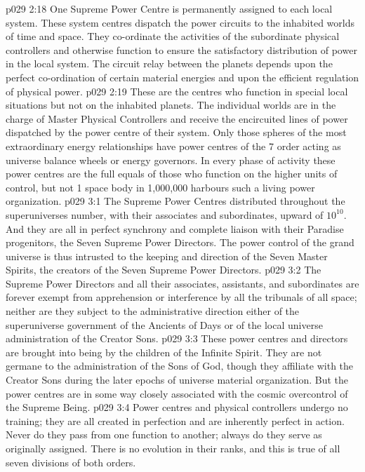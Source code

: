 \vs p029 2:18 \bibnobreakspace {} One Supreme Power Centre is permanently assigned to each local system. These system centres dispatch the power circuits to the inhabited worlds of time and space. They co\hyp{}ordinate the activities of the subordinate physical controllers and otherwise function to ensure the satisfactory distribution of power in the local system. The circuit relay between the planets depends upon the perfect co\hyp{}ordination of certain material energies and upon the efficient regulation of physical power.
\vs p029 2:19 \bibnobreakspace {} These are the centres who function in special local situations but not on the inhabited planets. The individual worlds are in the charge of Master Physical Controllers and receive the encircuited lines of power dispatched by the power centre of their system. Only those spheres of the most extraordinary energy relationships have power centres of the 7 order acting as universe balance wheels or energy governors. In every phase of activity these power centres are the full equals of those who function on the higher units of control, but not 1 space body in 1,000,000 harbours such a living power organization.
\vs p029 3:1 The Supreme Power Centres distributed throughout the superuniverses number, with their associates and subordinates, upward of $10^{10}$. And they are all in perfect synchrony and complete liaison with their Paradise progenitors, the Seven Supreme Power Directors. The power control of the grand universe is thus intrusted to the keeping and direction of the Seven Master Spirits, the creators of the Seven Supreme Power Directors.
\vs p029 3:2 The Supreme Power Directors and all their associates, assistants, and subordinates are forever exempt from apprehension or interference by all the tribunals of all space; neither are they subject to the administrative direction either of the superuniverse government of the Ancients of Days or of the local universe administration of the Creator Sons.
\vs p029 3:3 These power centres and directors are brought into being by the children of the Infinite Spirit. They are not germane to the administration of the Sons of God, though they affiliate with the Creator Sons during the later epochs of universe material organization. But the power centres are in some way closely associated with the cosmic overcontrol of the Supreme Being.
\vs p029 3:4 \pc Power centres and physical controllers undergo no training; they are all created in perfection and are inherently perfect in action. Never do they pass from one function to another; always do they serve as originally assigned. There is no evolution in their ranks, and this is true of all seven divisions of both orders.
